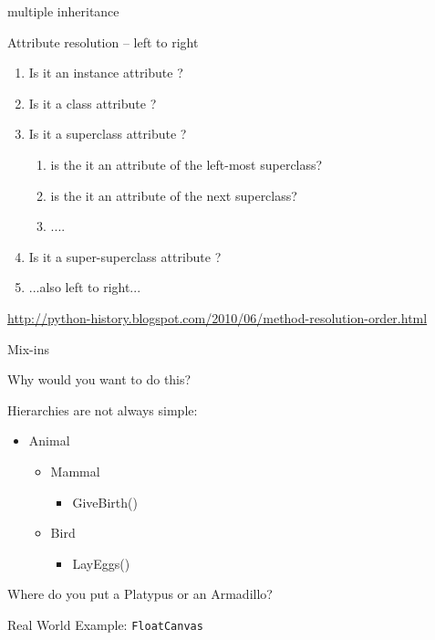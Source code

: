 \documentclass{beamer}
\begin{document}
\begin{frame}[fragile]{multiple inheritance}

\vfill
{\Large Attribute resolution -- left to right}

\begin{enumerate}
  \item Is it an instance attribute ?
  \item Is it a class attribute ?
  \item Is it a superclass attribute ?
  \begin{enumerate}
     \item is the it an attribute of the left-most superclass?
     \item is the it an attribute of the next superclass?
     \item ....
  \end{enumerate}
  \item Is it a super-superclass attribute ?
  \item ...also left to right...
\end{enumerate}

\vfill
\url{http://python-history.blogspot.com/2010/06/method-resolution-order.html}
\end{frame} 

\begin{frame}[fragile]{Mix-ins}

{\Large Why would you want to do this?}

\vfill
{\Large Hierarchies are not always simple:}
\vfill
{\large
\begin{itemize}
  \item Animal
  \begin{itemize}
    \item Mammal
    \begin{itemize}
      \item GiveBirth()
    \end{itemize}
    \item Bird
    \begin{itemize}
      \item LayEggs()
    \end{itemize}
  \end{itemize}
\end{itemize}
}

\vfill
{\Large Where do you put a Platypus or an Armadillo?}

\vfill
{\Large Real World Example: \verb|FloatCanvas|}
\end{frame} 
\end{document}
